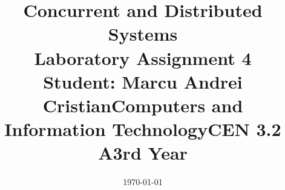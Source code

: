 \documentclass[14pt]{article}
\begin{document}
\title{%
  \huge Concurrent and Distributed Systems \\
  \vspace{20mm}
  \large Laboratory Assignment 4 \\}

\date{\today}
\maketitle
\begin{center}
\vspace{30 mm}

\title{\huge Student: Marcu Andrei Cristian}
\\\vspace{10 mm}
\title{\huge Computers and Information Technology}
\\\vspace{10 mm}
\title{\huge CEN 3.2 A}
\\\vspace{10 mm}
\title{\huge 3rd Year}
\end{center}
\date{}
\maketitle

\newpage
\end{document}
